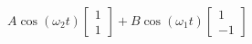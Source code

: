 \documentclass[preview]{standalone}
\begin{document}
\begin{center}
$A\cos(\omega_2 t)\begin{bmatrix} 1 \\ 1\end{bmatrix} + B \cos(\omega_1 t)\begin{bmatrix} 1 \\ -1\end{bmatrix}$
\end{center}
\end{document}
